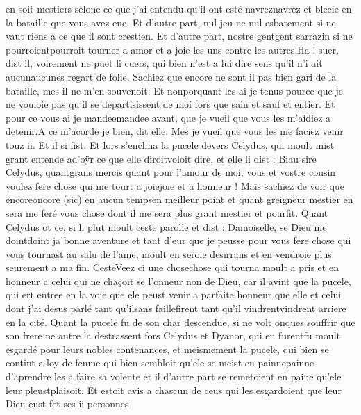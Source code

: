 \documentclass{article}
\begin{document}
\begin{pages}
      en soit mestiers selonc ce que j’ai entendu qu’il ont 
      esté navreznavrez et blecie en la bataille que vous avez eue. 
      Et d’autre part, nul jeu ne nul esbatement si ne vaut riens a ce que il sont crestien. 
      Et d’autre part, nostre 
      gentgent sarrazin 
      si ne pourroientpourroit tourner a amor et a joie les uns contre les autres.Ha ! suer, dist il, voirement ne puet li cuers, qui bien n’est a lui dire sens qu’il n’i ait 
      aucunaucunes regart de 
      folie. Sachiez que encore ne sont il pas bien gari de la bataille, mes il ne m’en souvenoit. Et nonporquant les ai je tenus pource 
      que je ne vouloie pas qu’il se departisissent de moi fors que sain et sauf et entier. Et pour ce vous ai 
      je 
      mandeemandee avant, que je vueil que vous les m’aidiez a detenir.A ce m’acorde je bien, dit elle. Mes je vueil que vous les me faciez venir touz ii.
   Et il si fist. Et lors s’enclina la pucele devers Celydus, 
   qui moult mist grant entende ad'oÿr ce que elle 
   diroitvoloit dire, et elle 
   li dist :
   Biau sire Celydus, 
      quantgrans mercis quant pour l’amour de moi, 
   vous et vostre cousin voulez fere chose qui me tourt a 
      joiejoie et a honneur ! Mais sachiez de voir que 
      encoreoncore (sic) 
         en aucun tempsen meilleur point et quant greigneur mestier en sera 
      me feré vous chose dont il me sera plus grant mestier et pourfit. \pend 
\pstart Quant Celydus ot ce, si li plut moult ceste parolle et dist :
   Damoiselle, se Dieu me dointdoint ja 
      bonne aventure et tant d’eur que je peusse pour vous fere chose 
   qui vous tournast au salu de l’ame, moult en seroie desirrans et en vendroie plus seurement a ma fin.
   CesteVeez ci une 
   chosechose qui tourna moult a pris et en honneur a celui qui ne chaçoit 
   se l’onneur non de Dieu, car il avint que 
   la pucele, qui ert entree en la voie que ele peust venir a parfaite honneur que elle 
   et celui dont j’ai desus parlé 
   tant qu’ilsans faillefirent tant qu'il 
   vindrentvindrent arriere en la cité. 
   Quant la pucele fu de son char descendue, si ne volt onques souffrir que 
   son frere ne autre la destrassent fors Celydus 
   et Dyanor, qui en furentfu moult esgardé 
   pour leurs nobles contenances, et meismement 
   la pucele, qui bien se contint a loy de fenme qui bien sembloit qu’ele se meist en 
   painnepainne d'aprendre les a faire sa volente et il d'autre part se remetoient en paine 
   qu’ele leur pleustplaisoit. Et estoit avis a chascun de ceus qui les 
   esgardoient que leur Dieu eust fet ses ii personnes 

\end{pages}
\end{document}
